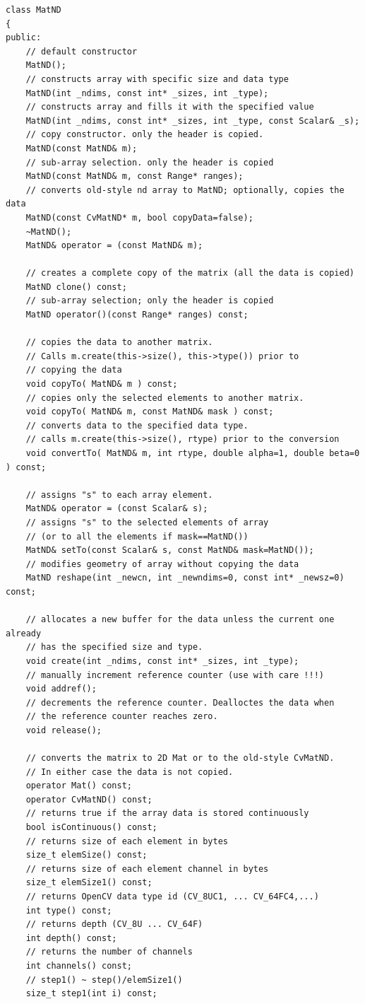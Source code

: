 \begin{lstlisting}
class MatND
{
public:
    // default constructor
    MatND();
    // constructs array with specific size and data type
    MatND(int _ndims, const int* _sizes, int _type);
    // constructs array and fills it with the specified value
    MatND(int _ndims, const int* _sizes, int _type, const Scalar& _s);
    // copy constructor. only the header is copied.
    MatND(const MatND& m);
    // sub-array selection. only the header is copied
    MatND(const MatND& m, const Range* ranges);
    // converts old-style nd array to MatND; optionally, copies the data
    MatND(const CvMatND* m, bool copyData=false);
    ~MatND();
    MatND& operator = (const MatND& m);

    // creates a complete copy of the matrix (all the data is copied)
    MatND clone() const;
    // sub-array selection; only the header is copied
    MatND operator()(const Range* ranges) const;

    // copies the data to another matrix.
    // Calls m.create(this->size(), this->type()) prior to
    // copying the data
    void copyTo( MatND& m ) const;
    // copies only the selected elements to another matrix.
    void copyTo( MatND& m, const MatND& mask ) const;
    // converts data to the specified data type.
    // calls m.create(this->size(), rtype) prior to the conversion
    void convertTo( MatND& m, int rtype, double alpha=1, double beta=0 ) const;

    // assigns "s" to each array element. 
    MatND& operator = (const Scalar& s);
    // assigns "s" to the selected elements of array
    // (or to all the elements if mask==MatND())
    MatND& setTo(const Scalar& s, const MatND& mask=MatND());
    // modifies geometry of array without copying the data
    MatND reshape(int _newcn, int _newndims=0, const int* _newsz=0) const;

    // allocates a new buffer for the data unless the current one already
    // has the specified size and type.
    void create(int _ndims, const int* _sizes, int _type);
    // manually increment reference counter (use with care !!!)
    void addref();
    // decrements the reference counter. Dealloctes the data when
    // the reference counter reaches zero.
    void release();

    // converts the matrix to 2D Mat or to the old-style CvMatND.
    // In either case the data is not copied.
    operator Mat() const;
    operator CvMatND() const;
    // returns true if the array data is stored continuously 
    bool isContinuous() const;
    // returns size of each element in bytes
    size_t elemSize() const;
    // returns size of each element channel in bytes
    size_t elemSize1() const;
    // returns OpenCV data type id (CV_8UC1, ... CV_64FC4,...)
    int type() const;
    // returns depth (CV_8U ... CV_64F)
    int depth() const;
    // returns the number of channels
    int channels() const;
    // step1() ~ step()/elemSize1()
    size_t step1(int i) const;


\end{lstlisting}
